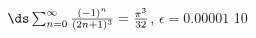 {$\ds \sum_{n=0}^\infty \frac{(-1)^{n}}{(2n+1)^3}=\frac{\pi^3}{32}$, \quad $\epsilon = 0.00001$
}
{10
}